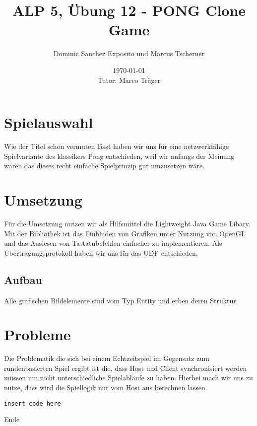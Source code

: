 \documentclass[a4paper,12pt]{article}
\begin{document}
\title{ALP 5, Übung 12 - PONG Clone Game}
\author{Dominic Sanchez Exposito und Marcus Tscherner}
\date{\today\\[3pt]
Tutor: Marco Träger}
\maketitle
\tableofcontents

\section{Spielauswahl}
Wie der Titel schon vermuten lässt haben wir uns für eine netzwerkfähige Spielvariante des klassikers Pong entschieden, weil wir anfangs der Meinung waren das dieses recht einfache Spielprinzip gut umzusetzen wäre. 
\section{Umsetzung}
Für die Umsetzung nutzen wir als Hilfsmittel die Lightweight Java Game Libary. Mit der Bibliothek ist das Einbinden von Grafiken unter Nutzung von OpenGL und das Auslesen von Tastatubefehlen einfacher zu implementieren. Als Übertragungsprotokoll haben wir uns für das UDP entschieden.
\subsection{Aufbau}
Alle grafischen Bildelemente sind vom Typ Entity und erben deren Struktur.
\section{Probleme}
Die Problematik die sich bei einem Echtzeitspiel im Gegensatz zum rundenbasierten Spiel ergibt ist die, dass Host und Client synchronisiert werden müssen um nicht unterschiedliche Spielabläufe zu haben. Hierbei mach wir uns zu nutze, dass wird die Spiellogik nur vom Host aus berechnen lassen.
\begin{lstlisting}[label=flickr, caption=show.php]
insert code here
\end{lstlisting}
Ende
\end{document}
